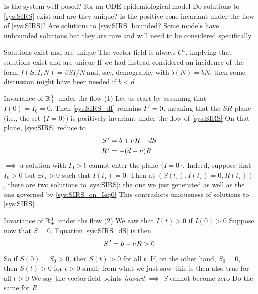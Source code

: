\documentclass[aspectratio=169]{beamer}\usepackage[]{graphicx}\usepackage[]{xcolor}
\begin{document}
\begin{frame}{Is the system well-posed?} 
For an ODE epidemiological model
\vfill
\bbullet Do solutions to \eqref{sys:SIRS} exist and are they unique?
\vfill
\bbullet Is the positive cone invariant under the flow of \eqref{sys:SIRS}?
\vfill
\bbullet Are solutions to \eqref{sys:SIRS} bounded?
Some models have unbounded solutions but they are rare and will need to be considered specifically
\end{frame}

\begin{frame}{Solutions exist and are unique}
\bbullet The vector field is always $C^1$, implying that solutions exist and are unique
\vfill
If we had instead considered an incidence of the form $f(S,I,N)=\beta SI/N$ and, say, demography with $b(N)=bN$, then some discussion might have been needed if $b<d$
\end{frame}


\begin{frame}{Invariance of $\mathbb{R}_+^3$ under the flow (1)}
Let us start by assuming that $I(0)=I_0=0$. Then \eqref{sys:SIRS_dI} remains $I\,'=0$, meaning that the $SR$-plane (i.e., the set $\{I=0\}$) is positively invariant under the flow of \eqref{sys:SIRS}
\vfill
On that plane, \eqref{sys:SIRS} reduce to
\begin{subequations}\label{sys:SIRS_on_Ieq0}
\begin{align}
S\,' &= b+\nu R-dS \\
R\,' &= -(d+\nu)R
\end{align}    
\end{subequations}
\vfill
$\implies$ a solution with $I_0>0$ cannot enter the plane $\{I=0\}$. Indeed, suppose that $I_0>0$ but $\exists t_\star>0$ such that $I(t_\star)=0$. Then at $(S(t_\star),I(t_\star)=0,R(t_\star))$, there are two solutions to \eqref{sys:SIRS}: the one we just generated as well as the one governed by \eqref{sys:SIRS_on_Ieq0}
\vfill
This contradicts uniqueness of solutions to \eqref{sys:SIRS}
\end{frame}

\begin{frame}{Invariance of $\mathbb{R}_+^3$ under the flow (2)} 
We saw that $I(t)>0$ if $I(0)>0$
\vfill
Suppose now that $S=0$. Equation \eqref{sys:SIRS_dS} is then
$$
S\,' = b+\nu R>0
$$
\vfill
So if $S(0)=S_0>0$, then $S(t)>0$ for all $t$. If, on the other hand, $S_0=0$, then $S(t)>0$ for $t>0$ small; from what we just saw, this is then also true for all $t>0$
\vfill
We say the vector field points \emph{inward}
\vfill
$\implies$ $S$ cannot become zero
\vfill
Do the same for $R$
\end{frame}
\end{document}
